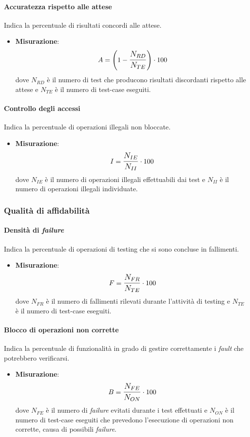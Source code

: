 \paragraph{Accuratezza rispetto alle attese}
Indica la percentuale di risultati concordi alle attese.
\begin{itemize}
	\item \textbf{Misurazione}: 
		$$A=\left(1-\mathlarger{\frac{N_{RD}}{N_{TE}}}\right) \cdot 100$$
	dove $N_{RD}$ è il numero di test che producono risultati discordanti rispetto alle attese e $N_{TE}$ è il numero di test-case eseguiti.
\end{itemize}

\paragraph{Controllo degli accessi}
Indica la percentuale di operazioni illegali non bloccate.
\begin{itemize}
	\item \textbf{Misurazione}: 
		$$I=\mathlarger{\frac{N_{IE}}{N_{II}}} \cdot 100$$
	dove $N_{IE}$ è il numero di operazioni illegali effettuabili dai test e $N_{II}$ è il numero di operazioni illegali individuate.
\end{itemize}

\subsubsection{Qualità di affidabilità}
\paragraph{Densità di \textit{failure}}
Indica la percentuale di operazioni di testing che si sono concluse in fallimenti.

\begin{itemize}
	\item \textbf{Misurazione}: 
		$$F=\mathlarger{\frac{N_{FR}}{N_{TE}}} \cdot 100$$
	dove $N_{FR}$ è il numero di fallimenti rilevati durante l'attività di testing e $N_{TE}$ è il numero di test-case eseguiti.
\end{itemize}

\paragraph{Blocco di operazioni non corrette}
Indica la percentuale di funzionalità in grado di gestire correttamente i \textit{fault} che potrebbero verificarsi.
\begin{itemize}
	\item \textbf{Misurazione}: 
		$$B=\mathlarger{\frac{N_{FE}}{N_{ON}}} \cdot 100$$
	dove $N_{FE}$ è il numero di \textit{failure} evitati durante i test effettuati e $N_{ON}$ è il numero di test-case eseguiti che prevedono l'esecuzione di operazioni non corrette, causa di possibili \textit{failure}.
\end{itemize}

